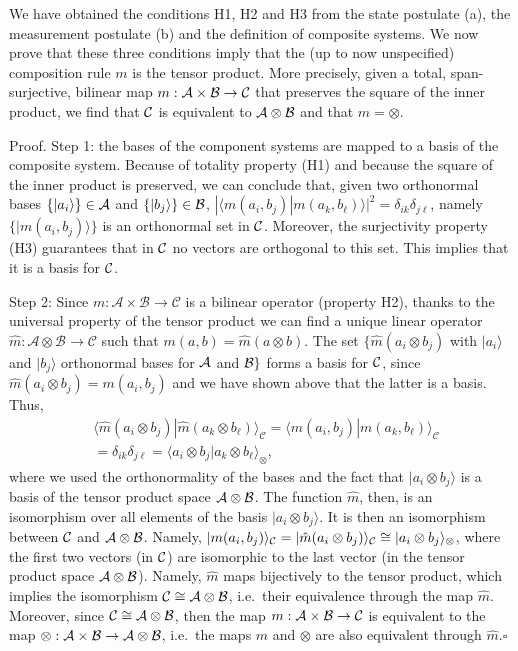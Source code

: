 \documentclass[aps,prl,amsmath,amssymb,twocolumn,nofootinbib]{revtex4}
\theoremstyle{plain}
\theoremstyle{definition}
\theoremstyle{remark}
\def\>{\rangle}
\def\<{\langle}
\def\labell#1{\label{#1}}
\begin{document}
	We have obtained the conditions H1, H2 and H3 from the state postulate
	(a), the measurement postulate (b) and the definition of composite
	systems. We now prove that these three conditions imply that the (up
	to now unspecified) composition rule $m$ is the tensor product. More
	precisely, given a total, span-surjective, bilinear map $m:{\cal A}\times{\cal B}\to{\cal C}$ that preserves the square of the inner
	product, we find that $\cal C $ is equivalent to
	$\cal A \otimes \cal B $ and that $m=\otimes$.
	
	Proof. Step 1: the bases of the component systems are mapped to a
	basis of the composite system. Because of totality property (H1) and
	because the square of the inner product is preserved, we can conclude
	that, given two orthonormal bases $\{|a_i\>\}\in{\cal A}$ and
	$\{|b_j\>\}\in{\cal B}$,
	$|\<m(a_i,b_j)|m(a_k,b_\ell)\>|^2=\delta_{ik}\delta_{j\ell}$, namely
	$\{|m(a_i,b_j)\>\}$ is an orthonormal set in $\cal C$.  Moreover, the
	surjectivity property (H3) guarantees that in $\cal C$ no vectors are
	orthogonal to this set. This implies that it is a basis for $\cal C$.
	
	Step 2: Since $m : \mathcal{A} \times \mathcal{B} \to \mathcal{C}$ is
	a bilinear operator (property H2), thanks to the universal property of
	the tensor product we can find a unique linear operator $\hat{m} :
	\mathcal{A} \otimes \mathcal{B} \to \mathcal{C}$ such that $m(a, b) =
	\hat m(a \otimes b)$. The set $\{ \hat m(a_i\otimes b_j)$ with
	$|a_i\>$ and $|b_j\>$ orthonormal bases for $\cal A$ and ${\cal B}\}$
	forms a basis for $\cal C$, since $\hat m(a_i\otimes b_j)=m(a_i,b_j)$
	and we have shown above that the latter is a basis.  Thus,
	\begin{align} 
	&\<\hat m(a_i\otimes b_j)|\hat m(a_k\otimes b_\ell)
	\>_{\mathcal{C}}=\<m(a_i,
	b_j)|m(a_k,b_\ell)\>_\mathcal{C} \nonumber\\& =
	\delta_{ik}\delta_{j\ell}
	= \<a_i\otimes
	b_j| a_k \otimes b_\ell\>_{\otimes},
	\labell{ecco}\; 
	\end{align}
	where we used the orthonormality of the bases and the fact that
	$|a_i\otimes b_j\>$ is a basis of the tensor product space ${\cal
		A}\otimes{\cal B}$. The function $\hat{m}$, then, is an isomorphism
	over all elements of the basis $|a_i\otimes b_j\>$. It is then an
	isomorphism between $\cal C$ and ${\cal A}\otimes{\cal B}$. Namely,
	$|m(a_i,b_j)\>_{\cal C} = |\hat{m}(a_i\otimes b_j)\>_{\cal C} \cong
	|a_i\otimes b_j\>_\otimes$, where the first two vectors (in $\cal C$)
	are isomorphic to the last vector (in the tensor product space ${\cal
		A}\otimes{\cal B}$). Namely, $\hat{m}$ maps bijectively to the
	tensor product, which implies the isomorphism ${\cal C}\cong{\cal
		A}\otimes{\cal B}$, i.e.~their equivalence through the map
	$\hat{m}$. Moreover, since ${\cal C}\cong{\cal A}\otimes{\cal B}$,
	then the map $m : \cal A \times \cal B \to \cal C$ is equivalent to
	the map $\otimes : \cal A \times \cal B \to \cal A \otimes \cal B$,
	i.e.~the maps $m$ and $\otimes$ are also equivalent through $\hat
	m$.$\square$
	
\end{document}

